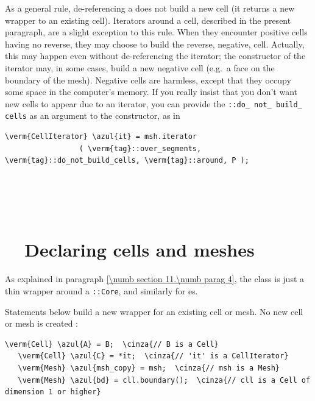 As a general rule, de-referencing a {\small\tt{}} does not build a new
cell (it returns a new wrapper to an existing cell).
Iterators around a cell, described in the present paragraph, are a slight exception to this
rule.
When they encounter positive cells having no reverse, they may choose to build the reverse,
negative, cell.
Actually, this may happen even without de-referencing the iterator;
the constructor of the iterator may, in some cases, build a new negative cell
(e.g.\ a face on the boundary of the mesh).
Negative cells are harmless, except that they occupy some space in the computer's memory.
If you really insist that you don't want new cells to appear due to an iterator,
you can provide the {\small\tt{}::do\_\,not\_\,build\_\,cells} as an argument
to the constructor, as in

\begin{Verbatim}[commandchars=\\\{\},formatcom=\small\tt,
   baselinestretch=0.94,framesep=2mm                      ]
   \verm{CellIterator} \azul{it} = msh.iterator
                 ( \verm{tag}::over_segments, \verm{tag}::do_not_build_cells, \verm{tag}::around, P );
\end{Verbatim}


\section{~~\cinza{[empty]}}\label{\numb section 9.\numb parag 11}


\section{~~Declaring cells and meshes}\label{\numb section 9.\numb parag 12}

As explained in paragraph \ref{\numb section 11.\numb parag 4}, the {\small\tt {}} class
is just a thin wrapper around a {\small\tt {}::Core}, and similarly for {\small\tt {}}es.

Statements below build a new wrapper for an existing cell or mesh.
No new cell or mesh is created :

\begin{Verbatim}[commandchars=\\\{\},formatcom=\small\tt,
   baselinestretch=0.94,framesep=2mm                      ]
   \verm{Cell} \azul{A} = B;  \cinza{// B is a Cell}
   \verm{Cell} \azul{C} = *it;  \cinza{// 'it' is a CellIterator}
   \verm{Mesh} \azul{msh_copy} = msh;  \cinza{// msh is a Mesh}
   \verm{Mesh} \azul{bd} = cll.boundary();  \cinza{// cll is a Cell of dimension 1 or higher}
\end{Verbatim}

